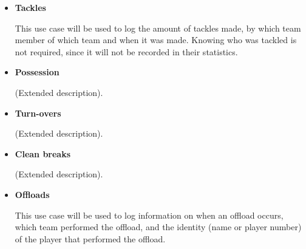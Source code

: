 \documentclass[a4paper,12pt]{report}
\begin{document}
\begin{itemize}
		\begin{center}
		\end{center}
	\item \textbf{Tackles}
		\begin{flushleft}
			This use case will be used to log the amount of tackles made, by which team member of which team and when it was made. Knowing who was tackled is not required, since it will not be recorded in their statistics.
		\end{flushleft}
		\begin{center}
		\end{center}
	\item \textbf{Possession}
		\begin{flushleft}
		(Extended description).
		\end{flushleft}
		\begin{center}
		\end{center}
	\item \textbf{Turn-overs}
		\begin{flushleft}
		(Extended description).
		\end{flushleft}
		\begin{center}
		\end{center}
	\item \textbf{Clean breaks}
		\begin{flushleft}
		(Extended description).
		\end{flushleft}
		\begin{center}
		\end{center}
	\item \textbf{Offloads}
		\begin{flushleft}
		This use case will be used to log information on when an offload occurs, which team performed the offload, and the identity (name or player number) of the player that performed the offload.
		\end{flushleft}
		\begin{center}

\end{center}
\end{itemize}
\end{document}
